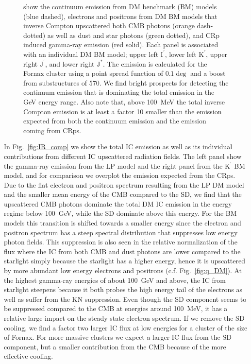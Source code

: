 \documentclass[10pt,aps,pra,reprint,amsmath,amsfonts,amssymb,showpacs]{revtex4-1}
\def\del#1{{}}
\newcommand{\rmn}{\mathrm}
\newcommand{\Kp}{\rmn{K}^\prime}
\newcommand{\Ip}{\rmn{I}^\prime}
\newcommand{\Js}{\rmn{J}^*}
\newcommand{\Jp}{\rmn{J}^\prime}
\begin{document}
\begin{figure}
\begin{minipage}{2.0\columnwidth}
{  show the continuum emission from DM benchmark (BM) models (blue
  dashed), electrons and positrons from DM BM models that inverse
  Compton upscattered both CMB photons (orange dash-dotted) as well as
  dust and star photons (green dotted), and CRp induced gamma-ray
  emission (red solid). Each panel is associated with an individual DM
  BM model; upper left $\Ip$, lower left $\Kp$, upper right $\Jp$, and
  lower right $\Js$. The emission is calculated for the Fornax cluster
  using a point spread function of $0.1\deg$ and a boost from
  substructures of 570. We find bright prospects for detecting the
  continuum emission that is dominating the total emission in the GeV
  energy range. Also note that, above 100~MeV the total inverse
  Compton emission is at least a factor 10 smaller than the emission
  expected from both the continuum emission and the emission coming
  from CRps.}
 \label{fig:diff_BM}
\end{minipage}
\end{figure}

\del{CONSIDER REWRITING, START WITH PHYSICS, THEN DISCUSS DOMINATING
CONTRIBUTIONS, PEAKS, AND SPECTRAL INDICES}

In Fig.~\ref{fig:IR_comp} we show the total IC emission as well as its
individual contributions from different IC upscattered radiation
fields. The left panel show the gamma-ray emission from the LP model
and the right panel from the $\Kp$ BM model, and for comparison we
overplot the emission expected from the CRps. Due to the flat electron
and positron spectrum resulting from the LP DM model and the smaller
mean energy of the CMB compared to the SD, we find that the
upscattered CMB photons dominate the total DM IC emission in the
energy regime below 100~GeV, while the SD dominate above this
energy. For the BM models this transition is shifted towards a smaller
energy since the electron and positron spectrum has a steep spectral
distribution that suppresses low energy photon fields. This
suppression is also seen in the relative normalization of the flux
where the IC from both CMB and dust photons are lower compared to the
starlight simply because the starlight has a higher energy, hence it
is upscattered by more abundant low energy electrons and positrons
(c.f. Fig.~\ref{fig:q_DM}). At the highest gamma-ray energies of about
100~GeV and above, the IC from starlight steepens because it both
probes the high energy tail of the electrons as well as suffer from
the KN suppression. Even though the SD component seems to be
suppressed compared to the CMB at energies around 100~MeV, it has a
relative large impact on the steady state electron spectrum. If we
remove the SD cooling, we find a factor two larger IC flux at low
energies for a cluster of the size of Fornax. For more massive
clusters we expect a larger IC flux from the SD component, but a
smaller contribution from the CMB because of the more effective
cooling.
\end{document}
